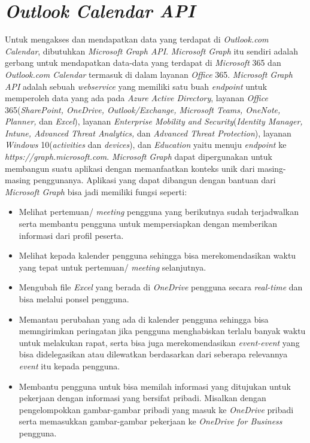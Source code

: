 \section{\textit{Outlook Calendar API}}
\label{sec:outlookcalendar}
Untuk mengakses dan mendapatkan data yang terdapat di \textit{Outlook.com Calendar}, dibutuhkan \textit{Microsoft Graph API}. \textit{Microsoft Graph} itu sendiri adalah gerbang untuk mendapatkan data-data yang terdapat di \textit{Microsoft} 365 dan \textit{Outlook.com Calendar} termasuk di dalam layanan \textit{Office} 365. \textit{Microsoft Graph API} adalah sebuah \textit{webservice} yang memiliki satu buah \textit{endpoint} untuk memperoleh data yang ada pada \textit{Azure Active Directory}, layanan \textit{Office} 365(\textit{SharePoint, OneDrive, Outlook/Exchange, Microsoft Teams, OneNote, Planner,} dan \textit{Excel}), layanan \textit{Enterprise Mobility and Security}(\textit{Identity Manager, Intune, Advanced Threat Analytics,} dan \textit{Advanced Threat Protection}), layanan \textit{Windows} 10(\textit{activities} dan \textit{devices}), dan \textit{Education }yaitu menuju \textit{endpoint} ke \textit{https://graph.microsoft.com}. \textit{Microsoft Graph} dapat dipergunakan untuk membangun suatu aplikasi dengan memanfaatkan konteks unik dari masing-masing penggunanya. Aplikasi yang dapat dibangun dengan bantuan dari \textit{Microsoft Graph} bisa jadi memiliki fungsi seperti:

\begin{itemize}
\item Melihat pertemuan/ \textit{meeting} pengguna yang berikutnya sudah terjadwalkan serta membantu pengguna untuk mempersiapkan dengan memberikan informasi dari profil peserta. 
\item Melihat kepada kalender pengguna sehingga bisa merekomendasikan waktu yang tepat untuk pertemuan/ \textit{meeting} selanjutnya. 
\item Mengubah file \textit{Excel} yang berada di \textit{OneDrive} pengguna secara \textit{real-time} dan bisa melalui ponsel pengguna.
\item Memantau perubahan yang ada di kalender pengguna sehingga bisa memngirimkan peringatan jika pengguna menghabiskan terlalu banyak waktu untuk melakukan rapat, serta bisa juga merekomendasikan \textit{event-event} yang bisa didelegasikan atau dilewatkan berdasarkan dari seberapa relevannya \textit{event} itu kepada pengguna.
\item Membantu pengguna untuk bisa memilah informasi yang ditujukan untuk pekerjaan dengan informasi yang bersifat pribadi. Misalkan dengan pengelompokkan gambar-gambar pribadi yang masuk ke \textit{OneDrive} pribadi serta memasukkan gambar-gambar pekerjaan ke \textit{OneDrive for Business} pengguna.     
\end{itemize} 

